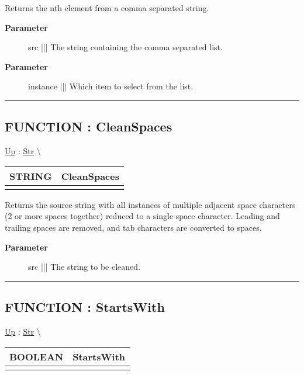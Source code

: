 \par
Returns the nth element from a comma separated string.

\par
\begin{description}
\item [\textbf{Parameter}] src ||| The string containing the comma separated list.
\item [\textbf{Parameter}] instance ||| Which item to select from the list.
\end{description}

\rule{\linewidth}{0.5pt}
\subsection*{FUNCTION : CleanSpaces}
\hypertarget{ecldoc:str.cleanspaces}{}
\hyperlink{ecldoc:Str}{Up} :
\hspace{0pt} \hyperlink{ecldoc:Str}{Str} \textbackslash 

{\renewcommand{\arraystretch}{1.5}
\begin{tabularx}{\textwidth}{|>{\raggedright\arraybackslash}l|X|}
\hline
\hspace{0pt}STRING & CleanSpaces \\
\hline
\multicolumn{2}{|>{\raggedright\arraybackslash}X|}{\hspace{0pt}(STRING src)} \\
\hline
\end{tabularx}
}

\par
Returns the source string with all instances of multiple adjacent space characters (2 or more spaces together) reduced to a single space character. Leading and trailing spaces are removed, and tab characters are converted to spaces.

\par
\begin{description}
\item [\textbf{Parameter}] src ||| The string to be cleaned.
\end{description}

\rule{\linewidth}{0.5pt}
\subsection*{FUNCTION : StartsWith}
\hypertarget{ecldoc:str.startswith}{}
\hyperlink{ecldoc:Str}{Up} :
\hspace{0pt} \hyperlink{ecldoc:Str}{Str} \textbackslash 

{\renewcommand{\arraystretch}{1.5}
\begin{tabularx}{\textwidth}{|>{\raggedright\arraybackslash}l|X|}
\hline
\hspace{0pt}BOOLEAN & StartsWith \\
\hline
\multicolumn{2}{|>{\raggedright\arraybackslash}X|}{\hspace{0pt}(STRING src, STRING prefix)} \\
\hline
\end{tabularx}
}

